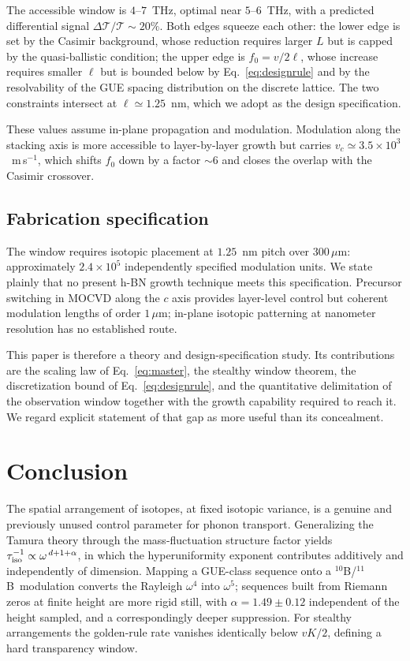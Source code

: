 \documentclass[
  aps,
  prl,
  reprint,
  amsmath,
  amssymb,
  superscriptaddress,
  floatfix,
  nofootinbib
]{revtex4-2}
\newcommand{\tenB}{$^{10}$B}
\newcommand{\elevenB}{$^{11}$B}
\newcommand{\Tr}{\mathcal{T}}
\begin{document}
The accessible window is $4$--$7$~THz, optimal near $5$--$6$~THz, with a
predicted differential signal $\Delta\Tr/\Tr\sim20\%$. Both edges squeeze each
other: the lower edge is set by the Casimir background, whose reduction
requires larger $L$ but is capped by the quasi-ballistic condition; the upper
edge is $f_0=v/2\ell$, whose increase requires smaller $\ell$ but is bounded
below by Eq.~\eqref{eq:designrule} and by the resolvability of the GUE spacing
distribution on the discrete lattice. The two constraints intersect at
$\ell\simeq1.25$~nm, which we adopt as the design specification.

These values assume in-plane propagation and modulation. Modulation along the
stacking axis is more accessible to layer-by-layer growth but carries
$v_c\simeq3.5\times10^{3}$~m\,s$^{-1}$, which shifts $f_0$ down by a factor
$\sim6$ and closes the overlap with the Casimir crossover.

\subsection{Fabrication specification}

The window requires isotopic placement at $1.25$~nm pitch over $300\,\mu$m:
approximately $2.4\times10^{5}$ independently specified modulation units. We
state plainly that no present h-BN growth technique meets this specification.
Precursor switching in MOCVD along the $c$ axis provides layer-level control
but coherent modulation lengths of order $1\,\mu$m; in-plane isotopic
patterning at nanometer resolution has no established route.

This paper is therefore a theory and design-specification study. Its
contributions are the scaling law of Eq.~\eqref{eq:master}, the stealthy
window theorem, the discretization bound of Eq.~\eqref{eq:designrule}, and the
quantitative delimitation of the observation window together with the growth
capability required to reach it. We regard explicit statement of that gap as
more useful than its concealment.

\section{Conclusion}

The spatial arrangement of isotopes, at fixed isotopic variance, is a genuine
and previously unused control parameter for phonon transport. Generalizing the
Tamura theory through the mass-fluctuation structure factor yields
$\tau_{\rm iso}^{-1}\propto\omega^{\,d+1+\alpha}$, in which the hyperuniformity
exponent contributes additively and independently of dimension. Mapping a GUE-class sequence onto a
\tenB/\elevenB\ modulation converts the Rayleigh $\omega^{4}$ into
$\omega^{5}$; sequences built from Riemann zeros at finite height are
more rigid still, with $\alpha=1.49\pm0.12$ independent of the height sampled,
and a correspondingly deeper suppression. For stealthy arrangements the golden-rule rate
vanishes identically below $vK/2$, defining a hard transparency window.
\end{document}
